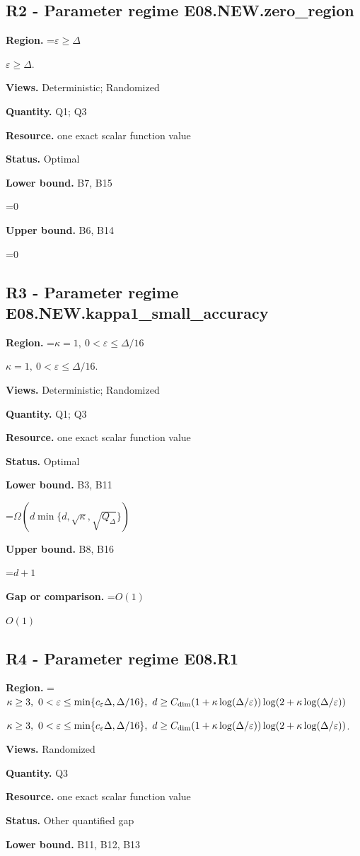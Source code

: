 \documentclass[10pt,a4paper]{article}
\newcommand{\AtlasMath}[1]{\par\begingroup\centering\setbox0=\hbox{$\displaystyle #1$}\ifdim\wd0>1.4\linewidth\typeout{ATLAS WIDE FORMULA: \the\wd0}\fi\ifdim\wd0>\linewidth\resizebox{\linewidth}{!}{\box0}\else\box0\fi\par\endgroup}
\newcommand{\AtlasInlineMath}[1]{\begingroup\setbox0=\hbox{$#1$}\ifdim\wd0>.4\linewidth\endgroup\AtlasMath{#1}\else\endgroup$#1$\fi}
\begin{document}
\subsection{R2 - Parameter regime E08.NEW.zero\_region}
\textbf{Region.} \AtlasInlineMath{\varepsilon\ge\Delta}.

\textbf{Views.} Deterministic; Randomized

\textbf{Quantity.} Q1; Q3

\textbf{Resource.} one exact scalar function value

\textbf{Status.} Optimal

\textbf{Lower bound.} B7, B15

\AtlasMath{0}
\textbf{Upper bound.} B6, B14

\AtlasMath{0}
\subsection{R3 - Parameter regime E08.NEW.kappa1\_small\_accuracy}
\textbf{Region.} \AtlasInlineMath{\kappa=1,\ 0<\varepsilon\le\Delta/16}.

\textbf{Views.} Deterministic; Randomized

\textbf{Quantity.} Q1; Q3

\textbf{Resource.} one exact scalar function value

\textbf{Status.} Optimal

\textbf{Lower bound.} B3, B11

\AtlasMath{\Omega(d\min\{d,\sqrt\kappa,\sqrt{Q_\Delta}\})}
\textbf{Upper bound.} B8, B16

\AtlasMath{d+1}
\textbf{Gap or comparison.} \AtlasInlineMath{O(1)}

\subsection{R4 - Parameter regime E08.R1}
\textbf{Region.} \AtlasInlineMath{\kappa\ge3,\ 0<\varepsilon\le\min\{c_\varepsilon\Delta,\Delta/16\},\ d\ge C_{\rm dim}(1+\kappa\log(\Delta/\varepsilon))\log(2+\kappa\log(\Delta/\varepsilon))}.

\textbf{Views.} Randomized

\textbf{Quantity.} Q3

\textbf{Resource.} one exact scalar function value

\textbf{Status.} Other quantified gap

\textbf{Lower bound.} B11, B12, B13
\end{document}

